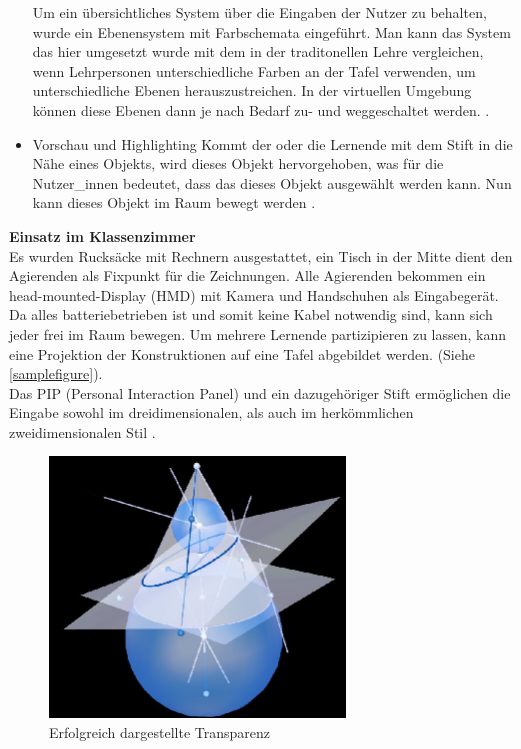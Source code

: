 \documentclass[deutsch]{llncs}
\begin{document}
\begin{itemize}
Um ein übersichtliches System über die Eingaben der Nutzer zu behalten, wurde ein Ebenensystem mit Farbschemata eingeführt. Man kann das System das hier umgesetzt wurde mit dem in der traditonellen Lehre vergleichen, wenn Lehrpersonen unterschiedliche Farben an der Tafel verwenden, um unterschiedliche Ebenen herauszustreichen. In der virtuellen Umgebung können diese Ebenen dann je nach Bedarf zu- und weggeschaltet werden. \cite{1667626}. 
\item Vorschau und Highlighting 
Kommt der oder die Lernende mit dem Stift in die Nähe eines Objekts, wird dieses Objekt hervorgehoben, was für die Nutzer\_innen bedeutet, dass das dieses Objekt ausgewählt werden kann. Nun kann dieses Objekt im Raum bewegt werden \cite{1667626}.  
\end{itemize}
\textbf{Einsatz im Klassenzimmer} \\
Es wurden Rucksäcke mit Rechnern ausgestattet, ein Tisch in der Mitte dient den Agierenden als Fixpunkt für die Zeichnungen. Alle Agierenden bekommen ein head-mounted-Display (HMD) mit Kamera und Handschuhen als Eingabegerät. Da alles batteriebetrieben ist und somit keine Kabel notwendig sind, kann sich jeder frei im Raum bewegen. 
Um mehrere Lernende partizipieren zu lassen, kann eine Projektion der Konstruktionen auf eine Tafel abgebildet werden. (Siehe \autoref{samplefigure}). \\
Das PIP (Personal Interaction Panel) und ein dazugehöriger Stift ermöglichen die Eingabe sowohl im dreidimensionalen, als auch im herkömmlichen zweidimensionalen Stil \cite{1667626}. 
\begin{figure}[h]
	\centering
	\includegraphics[width=0.7\textwidth]{figures/transparency}
	\caption{Erfolgreich dargestellte Transparenz}
	\label{fig:transparency}
\end{figure}
\end{document}
